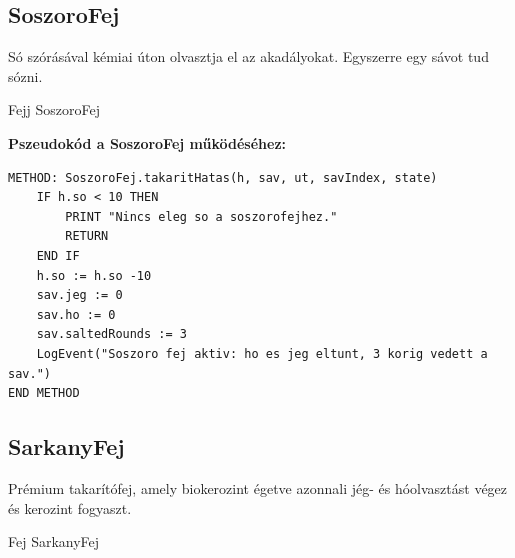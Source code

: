 \subsection{SoszoroFej}
\begin{class-template-responsibility}
    Só szórásával kémiai úton olvasztja el az akadályokat. Egyszerre egy sávot tud sózni. 
\end{class-template-responsibility}
\begin{class-template-baseclass}
    Fejj \baseclass SoszoroFej
\end{class-template-baseclass}
\begin{class-template-attribute}
\end{class-template-attribute}
\begin{class-template-method}
\end{class-template-method}

\textbf{Pszeudokód a SoszoroFej működéséhez:}
\begin{verbatim}
METHOD: SoszoroFej.takaritHatas(h, sav, ut, savIndex, state)
    IF h.so < 10 THEN
        PRINT "Nincs eleg so a soszorofejhez."
        RETURN
    END IF
    h.so := h.so -10
    sav.jeg := 0
    sav.ho := 0
    sav.saltedRounds := 3
    LogEvent("Soszoro fej aktiv: ho es jeg eltunt, 3 korig vedett a sav.")
END METHOD
\end{verbatim}

\subsection{SarkanyFej}
\begin{class-template-responsibility}
    Prémium takarítófej, amely biokerozint égetve azonnali jég- és hóolvasztást végez és kerozint fogyaszt.  
\end{class-template-responsibility}
\begin{class-template-baseclass}
    Fej \baseclass SarkanyFej
\end{class-template-baseclass}
\begin{class-template-attribute}
\end{class-template-attribute}
\begin{class-template-method}
\end{class-template-method}

